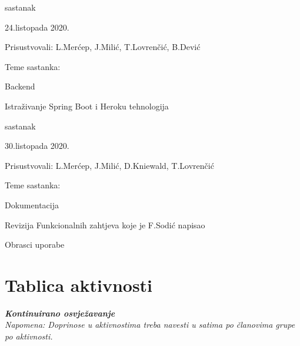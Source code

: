 \begin{packed_enum}
			\item  sastanak
			\item[] \begin{packed_item}
				\item 24.listopada 2020.
				\item Prisustvovali: L.Merćep, J.Milić, T.Lovrenčić, B.Dević
				\item Teme sastanka:
				\begin{packed_item}
					\item  Backend
					\item  Istraživanje Spring Boot i Heroku tehnologija
				\end{packed_item}
			\end{packed_item}
			
			\item  sastanak
			\item[] \begin{packed_item}
				\item 30.listopada 2020.
				\item Prisustvovali: L.Merćep, J.Milić, D.Kniewald, T.Lovrenčić
				\item Teme sastanka:
				\begin{packed_item}
					\item  Dokumentacija
					\item Revizija Funkcionalnih zahtjeva koje je F.Sodić napisao
					\item Obrasci uporabe
				\end{packed_item}
			\end{packed_item}
			
			
		\end{packed_enum}
		
		\eject
		\section*{Tablica aktivnosti}
		
			\textbf{\textit{Kontinuirano osvježavanje}}\\
			
			 \textit{Napomena: Doprinose u aktivnostima treba navesti u satima po članovima grupe po aktivnosti.}
					
						
			
